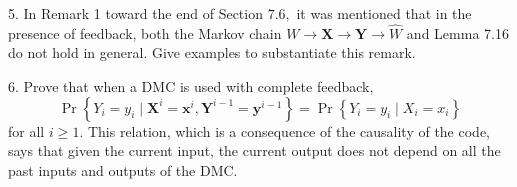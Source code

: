 \documentclass[8pt]{article}
\begin{document}
\begin{tcolorbox}
5. In Remark 1 toward the end of Section $7.6,$ it was mentioned that in the presence of feedback, both the Markov chain $W \rightarrow \mathbf{X} \rightarrow \mathbf{Y} \rightarrow \hat{W}$ and Lemma 7.16 do not hold in general. Give examples to substantiate this remark.
\end{tcolorbox}
\begin{tcolorbox}
6. Prove that when a DMC is used with complete feedback,
$$
\operatorname{Pr}\left\{Y_{i}=y_{i} \mid \mathbf{X}^{i}=\mathbf{x}^{i}, \mathbf{Y}^{i-1}=\mathbf{y}^{i-1}\right\}=\operatorname{Pr}\left\{Y_{i}=y_{i} \mid X_{i}=x_{i}\right\}
$$
for all $i \geq 1 .$ This relation, which is a consequence of the causality of the code, says that given the current input, the current output does not depend on all the past inputs and outputs of the DMC.
\end{tcolorbox}
\end{document}
